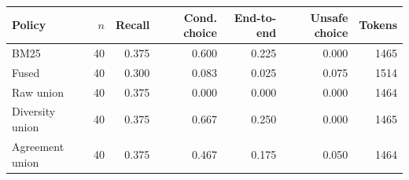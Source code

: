 \begin{tabular}{lrrrrrr}
\toprule
Policy & $n$ & Recall & Cond. choice & End-to-end & Unsafe choice & Tokens \\
\midrule
BM25 & 40 & 0.375 & 0.600 & 0.225 & 0.000 & 1465 \\
Fused & 40 & 0.300 & 0.083 & 0.025 & 0.075 & 1514 \\
Raw union & 40 & 0.375 & 0.000 & 0.000 & 0.000 & 1464 \\
Diversity union & 40 & 0.375 & 0.667 & 0.250 & 0.000 & 1465 \\
Agreement union & 40 & 0.375 & 0.467 & 0.175 & 0.050 & 1464 \\
\bottomrule
\end{tabular}
